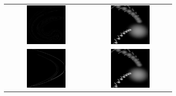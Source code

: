 \documentclass[10pt,a4paper,oneside]{article}
\theoremstyle{definition}
\begin{document}
\begin{figure}[t]
\begin{subfigure}{0.33\textwidth}
\begin{tabular}{c c }
		\includegraphics[width=0.5\textwidth]{../img/dimension/data-ikeda.png} & 
		\includegraphics[width=0.5\textwidth]{../img/dimension/model-henon.png} \\
		\includegraphics[width=0.5\textwidth]{../img/dimension/data-henon.png} & 
		\includegraphics[width=0.5\textwidth]{../img/dimension/model-henon.png} \\

\end{tabular}
\end{subfigure}
\end{figure}
\end{document}
